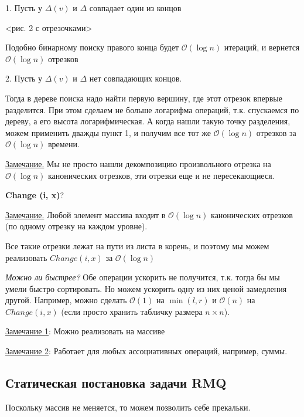 \documentclass[fleqn, 12pt]{article}
\newcommand{\bigo}{\mathcal{O}}
\begin{document}
1. Пусть у $ \Delta(v) $ и $ \Delta $ совпадает один из концов

<рис. 2 с отрезочками>

Подобно бинарному поиску правого конца будет $ \bigo(\log n) $ итераций, и вернется $ \bigo(\log n) $ отрезков

2. Пусть у $ \Delta(v) $ и $ \Delta $ нет совпадающих концов.

Тогда в дереве поиска надо найти первую вершину, где этот отрезок впервые разделится. При этом сделаем не больше логарифма операций, т.к. спускаемся по дереву, а его высота логарифмическая. А когда нашли такую точку разделения, можем применить дважды пункт 1, и получим все тот же $ \bigo(\log n) $ отрезков за $ \bigo(\log n) $ времени.

\underline{Замечание.} Мы не просто нашли декомпозицию произвольного отрезка на $ \bigo(\log n) $ канонических отрезков, эти отрезки еще и не пересекающиеся. 

\bigskip

\textbf{Change (i, x)}?

\underline{Замечание.} Любой элемент массива входит в $ \bigo(\log n) $ канонических отрезков (по одному отрезку на каждом уровне).

Все такие отрезки лежат на пути из листа в корень, и поэтому мы можем реализовать $ Change(i, x) $ за $ \bigo(\log n) $

\bigskip

\textit{Можно ли быстрее?} Обе операции ускорить не получится, т.к. тогда бы мы умели быстро сортировать. Но можем ускорить одну из них ценой замедления другой. Например, можно сделать $ \bigo(1) $ на $ \min(l, r) $ и $ \bigo(n) $ на $ Change(i, x) $ (если просто хранить табличку размера $ n \times n $).

\bigskip

\underline{Замечание 1}: Можно реализовать на массиве

\underline{Замечание 2}: Работает для любых ассоциативных операций, например, суммы.


\subsection{Статическая постановка задачи RMQ}

Поскольку массив не меняется, то можем позволить себе прекальки.
\end{document}

